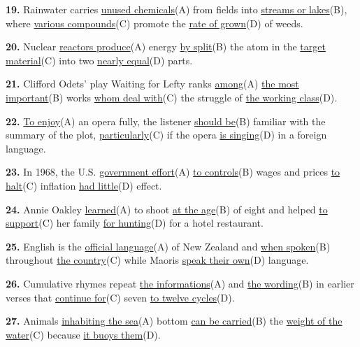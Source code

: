 \documentclass[12pt]{article}
\begin{document}
\vspace{\questionblockgap}
\noindent\textbf{19.} Rainwater carries \uline{unused chemicals}(A) from fields into \uline{streams or lakes}(B), where \uline{various compounds}(C) promote the \uline{rate of grown}(D) of weeds.
\par
\vspace{\questionblockgap}
\noindent\textbf{20.} Nuclear \uline{reactors produce}(A) energy \uline{by split}(B) the atom in the \uline{target material}(C) into two \uline{nearly equal}(D) parts.
\par
\vspace{\questionblockgap}
\noindent\textbf{21.} Clifford Odets' play Waiting for Lefty ranks \uline{among}(A) \uline{the most important}(B) works \uline{whom deal with}(C) the struggle of \uline{the working class}(D).
\par
\vspace{\questionblockgap}
\noindent\textbf{22.} \uline{To enjoy}(A) an opera fully, the listener \uline{should be}(B) familiar with the summary of the plot, \uline{particularly}(C) if the opera \uline{is singing}(D) in a foreign language.
\par
\vspace{\questionblockgap}
\noindent\textbf{23.} In 1968, the U.S. \uline{government effort}(A) \uline{to controls}(B) wages and prices \uline{to halt}(C) inflation \uline{had little}(D) effect.
\par
\vspace{\questionblockgap}
\noindent\textbf{24.} Annie Oakley \uline{learned}(A) to shoot \uline{at the age}(B) of eight and helped \uline{to support}(C) her family \uline{for hunting}(D) for a hotel restaurant.
\par
\vspace{\questionblockgap}
\noindent\textbf{25.} English is the \uline{official language}(A) of New Zealand and \uline{when spoken}(B) throughout \uline{the country}(C) while Maoris \uline{speak their own}(D) language.
\par
\vspace{\questionblockgap}
\noindent\textbf{26.} Cumulative rhymes repeat \uline{the informations}(A) and \uline{the wording}(B) in earlier verses that \uline{continue for}(C) seven \uline{to twelve cycles}(D).
\par
\vspace{\questionblockgap}
\noindent\textbf{27.} Animals \uline{inhabiting the sea}(A) bottom \uline{can be carried}(B) the \uline{weight of the water}(C) because \uline{it buoys them}(D).
\end{document}
